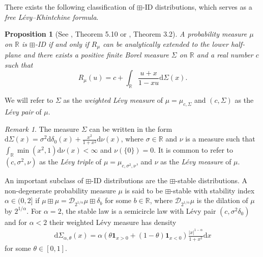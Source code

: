 \documentclass[reqno]{amsart}
\newcommand{\oindicator}[1]{\ensuremath{\mathbf{1}_{{#1}}}}
\newcommand{\1}{\mathbf{1}}
\newcommand{\dd}{\mathrm{d}}
\newcommand{\R}{\mathbb{R}}
\def\R{\mathbb{R}}
\theoremstyle{plain}
\newtheorem{proposition}[theorem]{Proposition}
\theoremstyle{definition}
\theoremstyle{remark}
\newtheorem{remark}[theorem]{Remark}
\numberwithin{equation}{section}
\begin{document}
 There exists the following classification of $\boxplus$-ID distributions, which serves as a \emph{free L\'evy--Khintchine formula}. \begin{proposition}[See \cite{Bercovici-Voiculescu1993}, Theorem 5.10 or \cite{Bercovici-Pata1999}, Theorem 3.2]\label{rthm:ID rep}
	A probability measure $\mu$ on $\R$ is $\boxplus$-ID if and only if $R_{\mu}$ can be analytically extended to the lower half-plane and there exists a positive finite Borel measure $\Sigma$ on $\R$ and a real number $c$ such that 
	\begin{equation}\label{eq:free levy-khin}
		R_{\mu}(u)=c+\int_{\R}\frac{u+x}{1-xu}\dd\Sigma(x).
	\end{equation}
\end{proposition}  We will refer to $\Sigma$ as the \emph{weighted L\'evy measure} of $\mu =\mu_{c,\Sigma}$ and $(c,\Sigma)$ as the \emph{L\'evy pair} of $\mu$.  
\begin{remark}\label{rem:weighted_levy}
	 The measure $\Sigma$ can be written in the form $\dd\Sigma(x)=\sigma^2\dd\delta_0(x)+\frac{x^2}{1+x^2}\dd\nu(x)$, where $\sigma\in\R$ and $\nu$ is a measure such that $\int_{\R}\min(x^2,1)\dd\nu(x)<\infty$ and $\nu(\{0\})=0$. It is common to refer to $(c,\sigma^2,\nu)$ as the \emph{L\'evy triple} of $\mu=\mu_{c,\sigma ^2,\nu}$, and $\nu$ as the \emph{L\'evy measure} of $\mu$.  
\end{remark}
An important subclass of $\boxplus$-ID distributions are the $\boxplus$-stable distributions.  A non-degenerate probability measure  $\mu$ is said to be $\boxplus$-stable with stability index $\alpha\in (0,2]$ if $\mu\boxplus \mu=\mathcal{D}_{2^{1/\alpha}}\mu\boxplus\delta_{b}$ for some $b\in\R$, where $\mathcal{D}_{2^{1/\alpha}}\mu$ is the dilation of $\mu$ by $2^{1/\alpha}$.  For $\alpha=2$, the stable law is a semicircle law with L\'evy pair $(c,\sigma^2\delta_0)$ and for $\alpha<2$ their weighted L\'evy measure has density
\begin{align}\label{eq:stable_levy_measure}
	\dd \Sigma_{\alpha,\theta}(x)=\alpha (\theta\oindicator{x>0}+(1-\theta)\oindicator{x<0} )\frac{|x|^{1-\alpha}}{1+x^2}\dd x 
\end{align}
for some $\theta\in[0,1]$.
\end{document}

